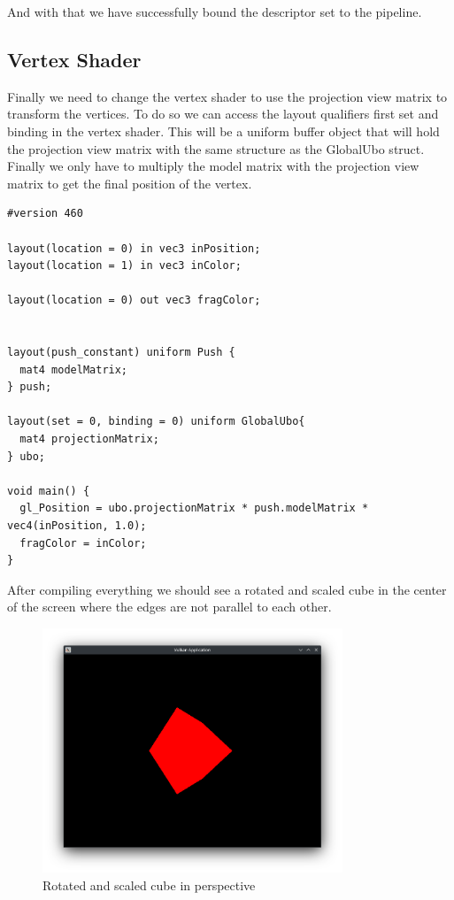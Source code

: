 \documentclass[12pt]{report} \usepackage{preamble}
\begin{document}
And with that we have successfully bound the descriptor set to the pipeline.

\subsection{Vertex Shader}

Finally we need to change the vertex shader to use the projection view matrix to transform the vertices.
To do so we can access the layout qualifiers first set and binding in the vertex shader.
This will be a uniform buffer object that will hold the projection view matrix with the same structure as the GlobalUbo struct.
Finally we only have to multiply the model matrix with the projection view matrix to get the final position of the vertex.

\begin{lstlisting}[Language=C++]
#version 460

layout(location = 0) in vec3 inPosition;
layout(location = 1) in vec3 inColor;

layout(location = 0) out vec3 fragColor;


layout(push_constant) uniform Push {
  mat4 modelMatrix;
} push;

layout(set = 0, binding = 0) uniform GlobalUbo{
  mat4 projectionMatrix;
} ubo;

void main() {
  gl_Position = ubo.projectionMatrix * push.modelMatrix * vec4(inPosition, 1.0);
  fragColor = inColor;
}
\end{lstlisting}

After compiling everything we should see a rotated and scaled cube in the center of the screen where the edges are not parallel to each other.

\begin{figure}[htbp]
	\centering
	\includegraphics[width=0.8\textwidth]{images/perspective_cube.png}
	\caption{Rotated and scaled cube in perspective}
\end{figure}

\listoffigures

\printbibliography[
	heading=bibintoc, title={Bibliography}
]
\end{document}
